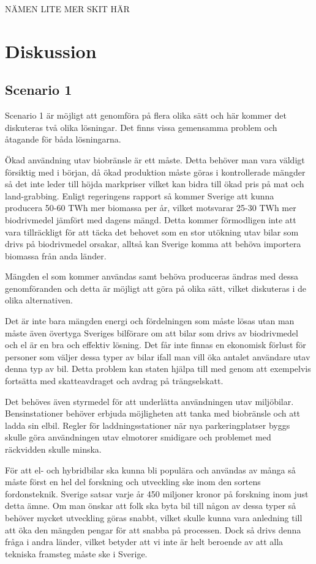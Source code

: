 \documentclass[a4paper,11pt,fleqn, titlepage]{article}
\begin{document}
NÄMEN LITE MER SKIT HÄR

\section{Diskussion}

\subsection{Scenario 1}
Scenario 1 är möjligt att genomföra på flera olika sätt och här kommer det diskuteras två olika lösningar. 
Det finns vissa gemensamma problem och åtagande för båda lösningarna.

Ökad användning utav biobränsle är ett måste. Detta behöver man vara väldigt försiktig med i början, då ökad produktion måste göras i kontrollerade mängder så det inte leder till höjda markpriser vilket kan bidra till ökad pris på mat och land-grabbing.
Enligt regeringens rapport så kommer Sverige att kunna producera 50-60 TWh mer biomassa per år, vilket motsvarar 25-30 TWh mer biodrivmedel jämfört med dagens mängd. Detta kommer förmodligen inte att vara tillräckligt för att täcka det behovet som en stor utökning utav bilar som drivs på biodrivmedel orsakar, alltså kan Sverige komma att behöva importera biomassa från anda länder.

Mängden el som kommer användas samt behöva produceras ändras med dessa genomföranden och detta är möjligt att göra på olika sätt, vilket diskuteras i de olika alternativen.

Det är inte bara mängden energi och fördelningen som måste lösas utan man måste även övertyga Sveriges bilförare om att bilar som drivs av biodrivmedel och el är en bra och effektiv lösning.
Det får inte finnas en ekonomisk förlust för personer som väljer dessa typer av bilar ifall man vill öka antalet användare utav denna typ av bil. Detta problem kan staten hjälpa till med genom att exempelvis fortsätta med skatteavdraget och avdrag på trängselskatt.

Det behöves även styrmedel för att underlätta användningen utav miljöbilar. Bensinstationer behöver erbjuda möjligheten att tanka med biobränsle och att ladda sin elbil. Regler för laddningsstationer när nya parkeringplatser byggs skulle göra användningen utav elmotorer smidigare och problemet med räckvidden skulle minska.

För att el- och hybridbilar ska kunna bli populära och användas av många så måste först en hel del forskning och utveckling ske inom den sortens fordonsteknik. Sverige satsar varje år 450 miljoner kronor på forskning inom just detta ämne\cite[s.~44]{elforskelbil}. Om man önskar att folk ska byta bil till någon av dessa typer så behöver mycket utveckling göras snabbt, vilket skulle kunna vara anledning till att öka den mängden pengar för att snabba på processen. Dock så drivs denna fråga i andra länder, vilket betyder att vi inte är helt beroende av att alla tekniska framsteg måste ske i Sverige.
\end{document}
